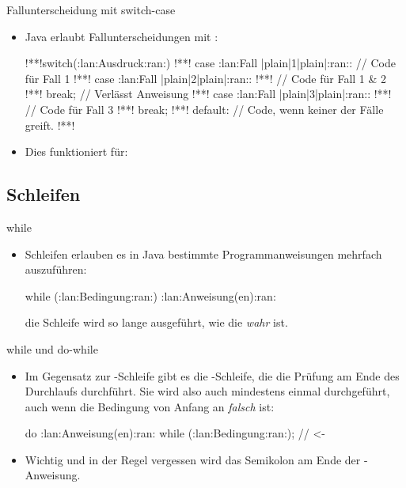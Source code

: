 \begin{frame}[fragile]{Fallunterscheidung mit switch-case}
    \begin{itemize}[<+(1)->]
        \item Java erlaubt Fallunterscheidungen mit :\pause{}
\begin{plainjava}
!**!switch(:lan:Ausdruck:ran:){
!**!    case :lan:Fall |plain|1|plain|:ran:: // Code für Fall 1
!**!    case :lan:Fall |plain|2|plain|:ran::
!**!        // Code für Fall 1 & 2
!**!        break; // Verlässt Anweisung
!**!    case :lan:Fall |plain|3|plain|:ran::
!**!        // Code für Fall 3
!**!        break;
!**!    default: // Code, wenn keiner der Fälle greift.
!**!}
\end{plainjava}
    \item<10-> Dies funktioniert für: 
    \end{itemize}
\end{frame}

\subsection{Schleifen}

\begin{frame}[fragile]{while}
    \begin{itemize}[<+(1)->]
        \item Schleifen erlauben es in Java bestimmte Programmanweisungen mehrfach auszuführen:\pause{}
        \begin{plainjava}
while (:lan:Bedingung:ran:) {
    :lan:Anweisung(en):ran:
}
        \end{plainjava}
        \pause{} die Schleife wird so lange ausgeführt, wie die  \emph{wahr} ist.
    \end{itemize}
\end{frame}

\begin{frame}[fragile]{while und do-while}
    \begin{itemize}[<+(1)->]
        \item Im Gegensatz zur -Schleife gibt es die -Schleife,\pause{} die die Prüfung am Ende des Durchlaufs durchführt.\pause{} Sie wird also auch mindestens einmal durchgeführt,\pause{} auch wenn die Bedingung von Anfang an \emph{falsch} ist:
        \begin{plainjava}
do {
    :lan:Anweisung(en):ran:
} while (:lan:Bedingung:ran:); // <-
        \end{plainjava}
        \item Wichtig und in der Regel vergessen wird das Semikolon am Ende der -Anweisung.
    \end{itemize}
\end{frame}

